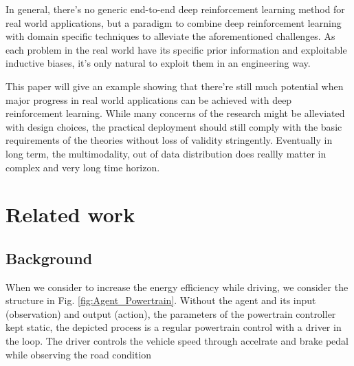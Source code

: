 \documentclass{article}
\begin{document}
In general, there's no generic end-to-end deep reinforcement learning method for real world applications, but a paradigm to combine deep reinforcement learning with domain specific techniques to alleviate the aforementioned challenges. As each problem in the real world have its specific prior information and exploitable inductive biases, it's only natural to exploit them in an engineering way.

This paper will give an example showing that there're still much potential when major progress in real world applications can be achieved with deep reinforcement learning. While many concerns of the research might be alleviated with design choices, the practical deployment should still comply with the basic requirements of the theories without loss of validity stringently. Eventually in long term, the multimodality, out of data distribution does reallly matter in complex and very long time horizon.

\section{Related work}
\label{sec:related}




\subsection{Background}
\label{sec:intro:background}

When we consider to increase the energy efficiency while driving, we consider the structure in Fig. \ref{fig:Agent_Powertrain}. Without the agent and its input (observation) and output (action), the parameters of the powertrain controller kept static, the depicted process is a regular powertrain control with a driver in the loop. The driver controls the vehicle speed through accelrate and brake pedal while observing the road condition

\end{document}
